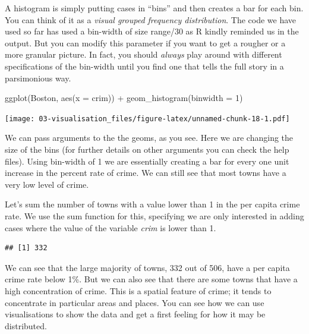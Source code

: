 \documentclass[
]{book}
\newenvironment{Shaded}{\begin{snugshade}}{\end{snugshade}}
\newcommand{\AttributeTok}[1]{\textcolor[rgb]{0.77,0.63,0.00}{#1}}
\newcommand{\DecValTok}[1]{\textcolor[rgb]{0.00,0.00,0.81}{#1}}
\newcommand{\FunctionTok}[1]{\textcolor[rgb]{0.00,0.00,0.00}{#1}}
\newcommand{\NormalTok}[1]{#1}
\newcommand{\SpecialCharTok}[1]{\textcolor[rgb]{0.00,0.00,0.00}{#1}}
\begin{document}
A histogram is simply putting cases in ``bins'' and then creates a bar for each bin. You can think of it as a \emph{visual grouped frequency distribution}. The code we have used so far has used a bin-width of size range/30 as R kindly reminded us in the output. But you can modify this parameter if you want to get a rougher or a more granular picture. In fact, you should \emph{always} play around with different specifications of the bin-width until you find one that tells the full story in a parsimonious way.

\begin{Shaded}
\begin{Highlighting}[]
\FunctionTok{ggplot}\NormalTok{(Boston, }\FunctionTok{aes}\NormalTok{(}\AttributeTok{x =}\NormalTok{ crim)) }\SpecialCharTok{+}
  \FunctionTok{geom\_histogram}\NormalTok{(}\AttributeTok{binwidth =} \DecValTok{1}\NormalTok{) }
\end{Highlighting}
\end{Shaded}

\texttt{[image: 03-visualisation\_files/figure-latex/unnamed-chunk-18-1.pdf]}

We can pass arguments to the the geoms, as you see. Here we are changing the size of the bins (for further details on other arguments you can check the help files). Using bin-width of 1 we are essentially creating a bar for every one unit increase in the percent rate of crime. We can still see that most towns have a very low level of crime.

Let's sum the number of towns with a value lower than 1 in the per capita crime rate. We use the sum function for this, specifying we are only interested in adding cases where the value of the variable \emph{crim} is lower than 1.

\begin{Shaded}
\end{Shaded}

\begin{verbatim}
## [1] 332
\end{verbatim}

We can see that the large majority of towns, 332 out of 506, have a per capita crime rate below 1\%. But we can also see that there are some towns that have a high concentration of crime. This is a spatial feature of crime; it tends to concentrate in particular areas and places. You can see how we can use visualisations to show the data and get a first feeling for how it may be distributed.
\end{document}
